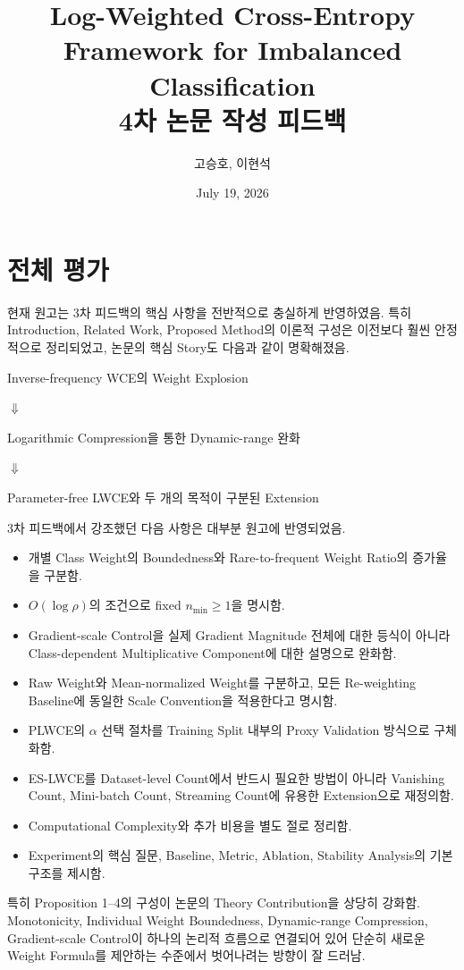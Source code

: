 \documentclass[11pt,a4paper]{article}
\title{\textbf{Log-Weighted Cross-Entropy Framework for Imbalanced Classification}\\
\vspace{5mm}
\large 4차 논문 작성 피드백}
\author{고승호, 이현석}
\date{July 19, 2026}
\begin{document}
\maketitle

\section{전체 평가}

현재 원고는 3차 피드백의 핵심 사항을 전반적으로 충실하게 반영하였음. 특히 Introduction, Related Work, Proposed Method의 이론적 구성은 이전보다 훨씬 안정적으로 정리되었고, 논문의 핵심 Story도 다음과 같이 명확해졌음.

\begin{center}
Inverse-frequency WCE의 Weight Explosion

$\Downarrow$

Logarithmic Compression을 통한 Dynamic-range 완화

$\Downarrow$

Parameter-free LWCE와 두 개의 목적이 구분된 Extension
\end{center}

3차 피드백에서 강조했던 다음 사항은 대부분 원고에 반영되었음.

\begin{itemize}
\item 개별 Class Weight의 Boundedness와 Rare-to-frequent Weight Ratio의 증가율을 구분함.
\item \(O(\log \rho)\)의 조건으로 fixed \(n_{\min}\geq 1\)을 명시함.
\item Gradient-scale Control을 실제 Gradient Magnitude 전체에 대한 등식이 아니라 Class-dependent Multiplicative Component에 대한 설명으로 완화함.
\item Raw Weight와 Mean-normalized Weight를 구분하고, 모든 Re-weighting Baseline에 동일한 Scale Convention을 적용한다고 명시함.
\item PLWCE의 \(\alpha\) 선택 절차를 Training Split 내부의 Proxy Validation 방식으로 구체화함.
\item ES-LWCE를 Dataset-level Count에서 반드시 필요한 방법이 아니라 Vanishing Count, Mini-batch Count, Streaming Count에 유용한 Extension으로 재정의함.
\item Computational Complexity와 추가 비용을 별도 절로 정리함.
\item Experiment의 핵심 질문, Baseline, Metric, Ablation, Stability Analysis의 기본 구조를 제시함.
\end{itemize}

특히 Proposition 1--4의 구성이 논문의 Theory Contribution을 상당히 강화함. Monotonicity, Individual Weight Boundedness, Dynamic-range Compression, Gradient-scale Control이 하나의 논리적 흐름으로 연결되어 있어 단순히 새로운 Weight Formula를 제안하는 수준에서 벗어나려는 방향이 잘 드러남.
\end{document}

